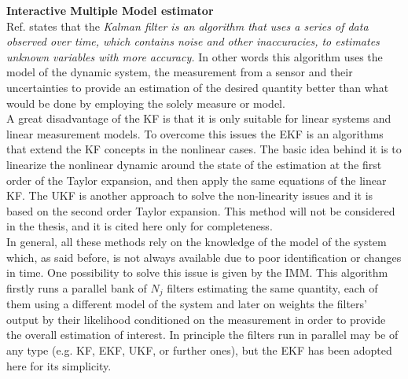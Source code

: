 \textbf{Interactive Multiple Model estimator}\label{subsec:IMM}\\
Ref. \cite{Kalman_Filter_and_Its_Application} states that the \textit{Kalman filter is an algorithm that uses a series of data observed over time, which contains noise and other inaccuracies, to estimates unknown variables with more accuracy.} In other words this algorithm uses the model of the dynamic system, the measurement from a sensor and their uncertainties to provide an estimation of the desired quantity better than what would be done by employing the solely measure or model.\\
 A great disadvantage of the \acrfull{KF} is that it is only suitable for linear systems and linear measurement models. To overcome this issues the \acrfull{EKF} is an algorithms that extend the KF concepts in the nonlinear cases. The basic idea behind it is to linearize the nonlinear dynamic around the state of the estimation at the first order of the Taylor expansion, and then apply the same equations of the linear \acrshort{KF}. The \acrfull{UKF} is another approach to solve the non-linearity issues and it is based on the second order Taylor expansion. This method will not be considered in the thesis, and it is cited here only for completeness.\\
In general, all these methods rely on the knowledge of the model of the system which, as said before, is not always available due to poor identification or changes in time. One possibility to solve this issue is given by the \acrshort{IMM}. This algorithm firstly runs a parallel bank of $N_j$ filters estimating the same quantity, each of them using a different model of the system and later on weights the filters' output by their likelihood conditioned on the measurement in order to provide the overall estimation of interest. In principle the filters run in parallel may be of any type (e.g. KF, EKF, UKF, or further ones), but the EKF has been adopted here for its simplicity. 


